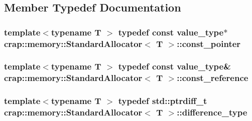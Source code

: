 \subsection{Member Typedef Documentation}
\hypertarget{classcrap_1_1memory_1_1_standard_allocator_aa04b0d1d61d571ec3e7845038fd39144}{
\subsubsection[{const\-\_\-pointer}]{\setlength{\rightskip}{0pt plus 5cm}template$<$typename T $>$ typedef const {\bf value\-\_\-type}$\ast$ {\bf crap\-::memory\-::\-Standard\-Allocator}$<$ T $>$\-::{\bf const\-\_\-pointer}}}\label{classcrap_1_1memory_1_1_standard_allocator_aa04b0d1d61d571ec3e7845038fd39144}
\hypertarget{classcrap_1_1memory_1_1_standard_allocator_a465f96f36f9ae046e9af1a0b15d9ae91}{
\subsubsection[{const\-\_\-reference}]{\setlength{\rightskip}{0pt plus 5cm}template$<$typename T $>$ typedef const {\bf value\-\_\-type}\& {\bf crap\-::memory\-::\-Standard\-Allocator}$<$ T $>$\-::{\bf const\-\_\-reference}}}\label{classcrap_1_1memory_1_1_standard_allocator_a465f96f36f9ae046e9af1a0b15d9ae91}
\hypertarget{classcrap_1_1memory_1_1_standard_allocator_a4af311d64dd0118965f23b6e1d0e185e}{
\subsubsection[{difference\-\_\-type}]{\setlength{\rightskip}{0pt plus 5cm}template$<$typename T $>$ typedef std\-::ptrdiff\-\_\-t {\bf crap\-::memory\-::\-Standard\-Allocator}$<$ T $>$\-::{\bf difference\-\_\-type}}}\label{classcrap_1_1memory_1_1_standard_allocator_a4af311d64dd0118965f23b6e1d0e185e}

